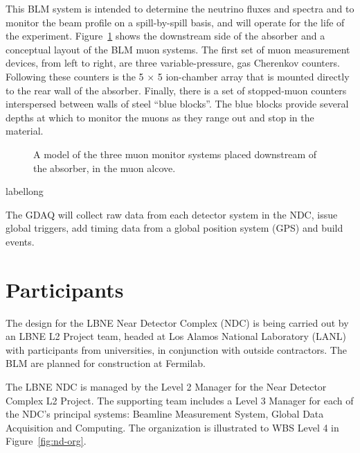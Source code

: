 This BLM system is intended to determine the neutrino fluxes and spectra
and to monitor the beam profile on a spill-by-spill basis, and will operate for the life of the
experiment. 
Figure~\ref{fig:MuonSystemsOverview} shows the downstream side of the absorber and a conceptual 
layout of the BLM muon systems.
The first set 
of muon measurement devices, from  left to right, are three
variable-pressure, gas Cherenkov counters. Following these counters 
is the 5 $\times$ 5 ion-chamber array that is
 mounted directly to the rear wall of the absorber. 
Finally, there is a set of stopped-muon counters 
 interspersed between walls of steel ``blue blocks''. The blue blocks 
provide several
 depths at which to monitor the muons as they range out and stop 
in the material.

\begin{figure}[htbp]
\begin{center}
\caption[Layout of muon monitors]
{A model of the three muon monitor systems placed downstream of the absorber, in the muon alcove. }
\label{fig:MuonSystemsOverview}
\end{center}
\end{figure}
\begin{cdrfigure}[short]{label}{long}
\end{cdrfigure}

The GDAQ will collect raw data from each
detector system in the NDC, issue global triggers, add timing data
from a global position system (GPS) and build events.


\section{Participants}

The design for the LBNE Near Detector Complex (NDC) is being carried out by an LBNE L2 Project team, headed at Los Alamos National Laboratory (LANL) 
with participants from universities, in conjunction with outside contractors.  
The BLM are planned for construction at 
Fermilab.

The LBNE NDC is managed by the 
Level 2 Manager for the Near Detector Complex L2 Project. The supporting team 
includes a Level 3 
Manager for each of the NDC's principal systems: Beamline Measurement System, Global Data Acquisition and Computing. The organization is illustrated to WBS Level 4 in Figure~\ref{fig:nd-org}.

